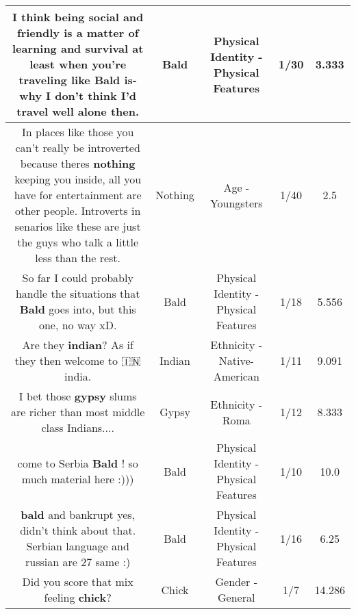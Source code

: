 \documentclass[11pt]{article}
\newlength\mylength
\begin{document}
\begin{center}
\begin{longtable}{|C{.65\mylength}|C{.30\mylength}|C{.12\mylength}|C{.12\mylength}|C{.12\mylength}|}
  \small I think being social and friendly is a matter of learning and survival at least when you're traveling like \textbf{Bald} is- why I don't think I'd travel well alone then.\normalsize   & Bald & Physical Identity - Physical Features & 1/30 & 3.333 \\  \hline
  \small In places like those you can't really be introverted because theres \textbf{nothing} keeping you inside, all you have for entertainment are other people. Introverts in senarios like these are just the guys who talk a little less than the rest.\normalsize   & Nothing & Age - Youngsters & 1/40 & 2.5 \\  \hline
  \small So far I could probably handle the situations that \textbf{Bald} goes into, but this one, no way xD.\normalsize   & Bald & Physical Identity - Physical Features & 1/18 & 5.556 \\  \hline
  \small Are they \textbf{indian}? As if they then welcome to 🇮🇳 india.\normalsize   & Indian & Ethnicity - Native-American & 1/11 & 9.091 \\  \hline
  \small I bet those \textbf{gypsy} slums are richer than most middle class Indians....\normalsize   & Gypsy & Ethnicity - Roma & 1/12 & 8.333 \\  \hline
  \small come to Serbia \textbf{Bald} ! so much material here :)))\normalsize   & Bald & Physical Identity - Physical Features & 1/10 & 10.0 \\  \hline
  \small \@\textbf{bald} and bankrupt  yes, didn't think about that. Serbian language  and russian are 27 same :)\normalsize   & Bald & Physical Identity - Physical Features & 1/16 & 6.25 \\  \hline
  \small Did you score that mix feeling \textbf{chick}?\normalsize   & Chick & Gender - General & 1/7 & 14.286 \\  \hline

\end{longtable}
\end{center}
\end{document}
